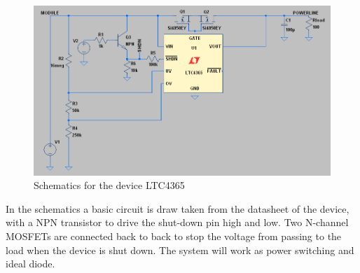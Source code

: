 \begin{figure}[H]
	\begin{centering}
		\includegraphics[width=1\textwidth]{images/tb5_LTC_simu1.png}
		\caption{Schematics for the device LTC4365}
	\end{centering}
\end{figure}

In the schematics a basic circuit is draw taken from the datasheet of the device, with a NPN transistor to drive the shut-down pin high and low. Two N-channel MOSFETs are connected back to back to  stop the voltage from passing to the load when the device is shut down. The system will work as power switching and ideal diode.

